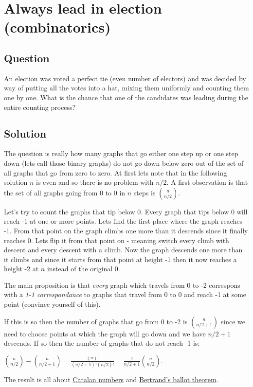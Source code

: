 \documentclass{article}
\begin{document}
\section{Always lead in election (combinatorics)}

\subsection{Question}


An election was voted a perfect tie (even number of electors) and was decided by way of putting
all the votes into a hat, mixing them uniformly and counting them one by one. What is the chance
that one of the candidates was leading during the entire counting process?

\subsection{Solution}
The question is really how many graphs that go either one step up or one step down (lets call those binary graphs) do not go down below zero out of the set of all graphs that go from zero to zero. At first lets note that in the following solution $n$ is even and so there is no problem with $n/2$. A first observation is that the set of all graphs going from 0 to 0 in $n$ steps is ${n \choose n/2}$.

Let's try to count the graphs that tip below 0. Every graph that tips below 0 will reach -1 at one or more points. Lets find the first place where the graph reaches -1. From that point on the graph climbs one more than it descends since it finally reaches 0. Lets flip it from that point on - meaning switch every climb with descent and every descent with a climb. Now the graph descends one more than it climbs and since it starts from that point at height -1 then it now reaches a height -2 at $n$ instead of the original 0.

The main proposition is that \emph{every} graph which travels from 0 to -2 correspons with a \emph{1-1 correspondance} to graphs that travel from 0 to 0 and reach -1 at some point (convince yourself
of this).

If this is so then the number of graphs that go from 0 to -2 is ${n \choose n/2+1}$ since we need to
choose points at which the graph will go down and we have $n/2+1$ descends. If so then the number of
graphs that do not reach -1 is:

${n \choose n/2} - {n \choose n/2+1} = \frac{(n)!}{(n/2+1)!(n/2)!} = \frac{1}{n/2+1}{n \choose n/2}$.

The result is all about \href{http://en.wikipedia.org/wiki/Catalan_number}{Catalan numbers} and
\href{http://en.wikipedia.org/wiki/http://en.wikipedia.org/wiki/Bertrand's_ballot_theorem}{Bertrand's ballot theorem}.

\label{end}
\end{document}
